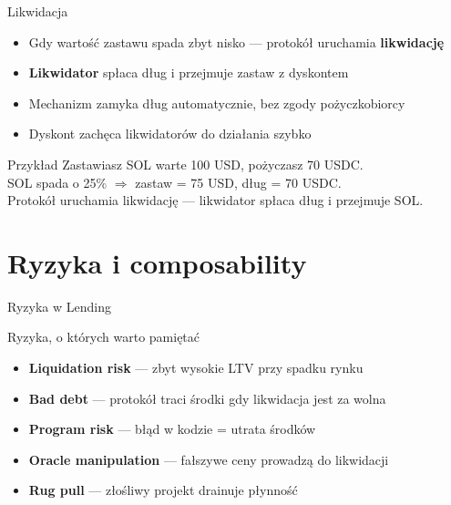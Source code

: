 \begin{frame}{Likwidacja}
  \begin{itemize}
    \item Gdy wartość zastawu spada zbyt nisko --- protokół uruchamia \textbf{likwidację}
    \item \textbf{Likwidator} spłaca dług i przejmuje zastaw z dyskontem
    \item Mechanizm zamyka dług automatycznie, bez zgody pożyczkobiorcy
    \item Dyskont zachęca likwidatorów do działania szybko
  \end{itemize}
  \vspace{0.3cm}
  \begin{exampleblock}{Przykład}
    Zastawiasz SOL warte 100 USD, pożyczasz 70 USDC. \\
    SOL spada o 25\% $\Rightarrow$ zastaw = 75 USD, dług = 70 USDC. \\
    Protokół uruchamia likwidację --- likwidator spłaca dług i przejmuje SOL.
  \end{exampleblock}
\end{frame}

\section{Ryzyka i composability}

\begin{frame}{Ryzyka w Lending}
  \begin{alertblock}{Ryzyka, o których warto pamiętać}
    \begin{itemize}
      \item \textbf{Liquidation risk} --- zbyt wysokie LTV przy spadku rynku
      \item \textbf{Bad debt} --- protokół traci środki gdy likwidacja jest za wolna
      \item \textbf{Program risk} --- błąd w kodzie = utrata środków
      \item \textbf{Oracle manipulation} --- fałszywe ceny prowadzą do likwidacji
      \item \textbf{Rug pull} --- złośliwy projekt drainuje płynność
    \end{itemize}
  \end{alertblock}
\end{frame}

